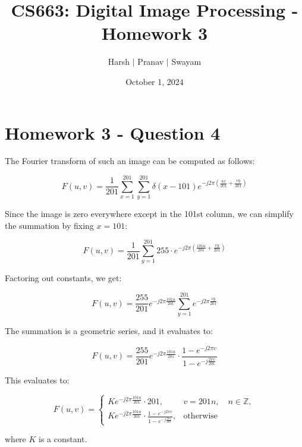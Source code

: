 \documentclass{article}
\title{CS663: Digital Image Processing - Homework 3}
\author{Harsh $\vert$ Pranav $\vert$ Swayam}
\date{October 1, 2024}
\begin{document}
\maketitle
\section{Homework 3 - Question 4}



The Fourier transform of such an image can be computed as follows:

\[
F(u,v) = \frac{1}{201} \sum_{x=1}^{201} \sum_{y=1}^{201} \delta(x - 101) e^{-j 2\pi \left( \frac{ux}{201} + \frac{vy}{201} \right)}
\]

Since the image is zero everywhere except in the 101st column, we can simplify the summation by fixing \( x = 101 \):

\[
F(u,v) = \frac{1}{201} \sum_{y=1}^{201} 255 \cdot e^{-j 2\pi \left( \frac{101u}{201} + \frac{vy}{201} \right)}
\]

Factoring out constants, we get:

\[
F(u,v) = \frac{255}{201} e^{-j 2\pi \frac{101u}{201}} \sum_{y=1}^{201} e^{-j 2\pi \frac{vy}{201}}
\]

The summation is a geometric series, and it evaluates to:

\[
F(u,v) = \frac{255}{201} e^{-j 2\pi \frac{101u}{201}} \cdot \frac{1 - e^{-j 2\pi v}}{1 - e^{-j \frac{2\pi v}{201}}}
\]

This evaluates to:

\[
F(u,v) = \begin{cases}
K e^{-j 2\pi \frac{101u}{201}} \cdot 201, & v = 201n, \quad n \in \mathbb{Z}, \\
K e^{-j 2\pi \frac{101u}{201}} \cdot \frac{1 - e^{-j 2\pi v}}{1 - e^{-j \frac{2\pi v}{201}}}, & \text{otherwise}
\end{cases}
\]

where \( K \) is a constant.
\end{document}
